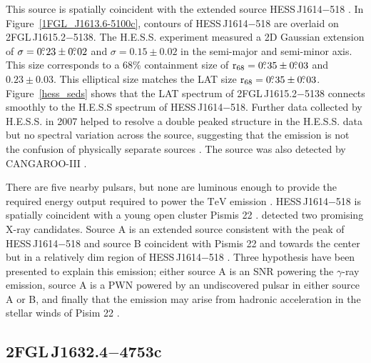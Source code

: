 \documentclass[12pt,preprint]{aastex}
\newcommand{\tev}{\text{TeV}\xspace}
\newcommand{\suzaku}{\text{{\em Suzaku}}\xspace}
\newcommand{\rsixeight}{{\ensuremath{\text{r}_{68}}}\xspace}
\newcommand{\hl}[1]{#1}
\begin{document}
This source is spatially coincident with the extended
\tev source HESS\,J1614$-$518 \citep{hess_plane_survey}. In
Figure~\ref{1FGL_J1613.6-5100c}, contours of HESS\,J1614$-$518 are overlaid
on 2FGL\,J1615.2$-$5138.  The H.E.S.S. experiment measured a 2D Gaussian
extension of $\sigma=0\mbox{$.\!\!^\circ$}23\pm0\mbox{$.\!\!^\circ$}02$ and $\sigma=0.15\pm0.02$
in the semi-major and semi-minor axis. This size corresponds
to a 68\% containment size of $\rsixeight=0\fdg35\pm0\fdg03$
and $0.23\pm0.03$.  This elliptical size matches the LAT size
$\rsixeight=0\fdg35\pm0\fdg03$.  Figure~\ref{hess_seds} shows
that the LAT spectrum of 2FGL\,J1615.2$-$5138 connects smoothly to
the H.E.S.S spectrum of HESS\,J1614$-$518.  Further data collected by
H.E.S.S. in 2007 helped to resolve a double peaked structure in the
H.E.S.S. data but no spectral variation across the source, suggesting
that the emission is not the confusion of physically separate sources
\citep{closer_look_hess_j1614-518}.  The source was also detected by
CANGAROO-III \citep{cangaroo_j1614-518}.

\hl{
There are five nearby pulsars, but none are luminous enough to
provide the required energy output required to power the $\tev$ 
emission \citep{closer_look_hess_j1614-518}.  HESS\,J1614$-$518
is spatially coincident with a young open cluster Pismis 22
\citep{hess_1614_landi_atel,closer_look_hess_j1614-518}.
\suzaku detected two
promising X-ray candidates. Source A is an extended source consistent
with the peak of HESS\,J1614$-$518 and source B coincident with Pismis 22
and towards the center but in a relatively dim region of HESS\,J1614$-$518
\citep{suazku_hess_j1614_518}.  Three hypothesis have been presented to
explain this emission; either source A is an SNR powering the $\gamma$-ray
emission, source A is a PWN powered by an undiscovered pulsar in either
source A or B, and finally that the emission may arise from hadronic 
acceleration in the stellar winds of Pisim 22 \citep{cangaroo_j1614-518}.
}

\subsection{2FGL\,J1632.4$-$4753c}
\label{section_2FGL_J1632.4-4753c}


\end{document}
